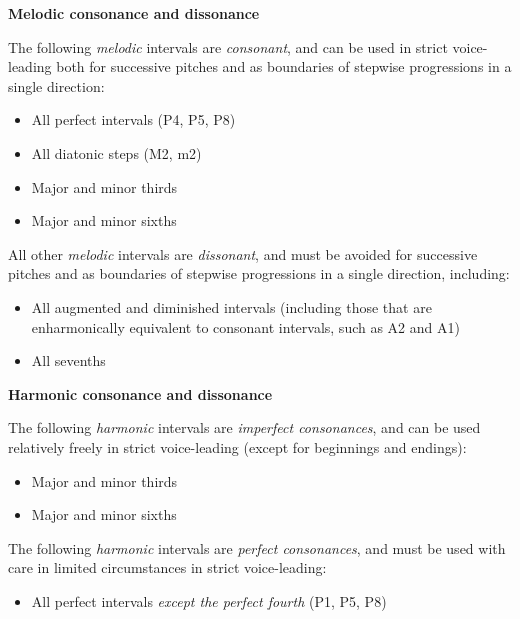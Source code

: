 \documentclass{book}
\providecommand{\tightlist}{%
  \setlength{\itemsep}{0pt}\setlength{\parskip}{0pt}}
\begin{document}
\textbf{Melodic consonance and dissonance}

The following \emph{melodic} intervals are \emph{consonant}, and can be used
in strict voice-leading both for successive pitches and as boundaries of
stepwise progressions in a single direction:

\begin{itemize}
\tightlist
\item
  All perfect intervals (P4, P5, P8)\\
\item
  All diatonic steps (M2, m2)\\
\item
  Major and minor thirds\\
\item
  Major and minor sixths
\end{itemize}

All other \emph{melodic} intervals are \emph{dissonant}, and must be avoided
for successive pitches and as boundaries of stepwise progressions in a single
direction, including:

\begin{itemize}
\tightlist
\item
  All augmented and diminished intervals (including those that are
  enharmonically equivalent to consonant intervals, such as A2 and A1)\\
\item
  All sevenths
\end{itemize}

\textbf{Harmonic consonance and dissonance}

The following \emph{harmonic} intervals are \emph{imperfect consonances}, and
can be used relatively freely in strict voice-leading (except for beginnings
and endings):

\begin{itemize}
\tightlist
\item
  Major and minor thirds\\
\item
  Major and minor sixths
\end{itemize}

The following \emph{harmonic} intervals are \emph{perfect consonances}, and
must be used with care in limited circumstances in strict voice-leading:

\begin{itemize}
\tightlist
\item
  All perfect intervals \emph{except the perfect fourth} (P1, P5, P8)
\end{itemize}
\end{document}
